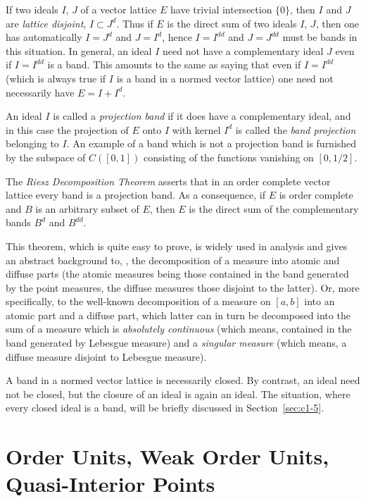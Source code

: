 If two ideals $ I $,  $ J $ of a vector lattice $ E $ have trivial intersection $ \{0\} $, then $ I $ and $ J $ are \emph{lattice disjoint}, \ie $ I \subset J^{d} $.
Thus if $ E $ is the direct sum of two ideals $ I $,  $ J $, then one has automatically $ I = J^{d} $ and $ J = I^{d} $, hence $ I = I^{dd} $ and $ J = J^{dd} $ must be bands in this situation.
In general, an ideal $ I $ need not have a complementary ideal $ J $ even if $ I = I^{dd} $ is a band.
This amounts to the same as saying that even if $ I = I^{dd} $ (which is always true if $ I $ is a band in a normed vector lattice) one need not necessarily have $ E = I + I^{d} $.

An ideal $ I $ is called a \emph{projection band} if it does have a complementary ideal, and in this case the projection of $ E $ onto $ I $ with kernel $ I^{d} $ is called the \emph{band projection} belonging to $ I $.
An example of a band which is not a projection band is furnished by the subspace of $ C([0,1]) $ consisting of the functions vanishing on $ [0,1/2] $.

The \emph{Riesz Decomposition Theorem} asserts that in an order complete vector lattice every band is a projection band.
As a consequence, if $ E $ is order complete and $ B $ is an arbitrary subset of $ E $, then $ E $ is the direct sum of the complementary bands $ B^{d} $ and $ B^{dd} $.

This theorem, which is quite easy to prove, is widely used in analysis and gives an abstract background to, \eg, the decomposition of a measure into atomic and diffuse parts (the atomic measures being those contained in the band generated by the point measures, the diffuse measures those disjoint to the latter). Or, more specifically, to the well-known decomposition of a measure on $ [a,b] $ into an atomic part and a diffuse part, which latter can in turn be decomposed into the sum of a measure which is \emph{absolutely continuous} (which means, contained in the band generated by Lebesgue measure) and a \emph{singular measure} (which means, a diffuse measure disjoint to Lebesgue measure).

A band in a normed vector lattice is necessarily closed.
By contrast, an ideal need not be closed, but the closure of an ideal is again an ideal.
The situation, where every closed ideal is a band, will be briefly discussed in Section~\ref{sec:c1-5}.
\section{Order Units, Weak Order Units, Quasi-Interior Points}\label{sec:c1-2}

